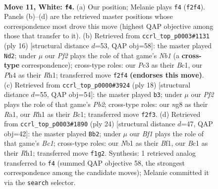 \documentclass[11pt]{article}
\begin{document}
\clearpage

\begin{figure}[p]\centering
\begin{subfigure}{0.46\textwidth}\centering
\resizebox{\linewidth}{!}{%
\newchessgame
\chessboard[
  setfen={r1b1kbnr/p1pp1ppp/4q3/4P3/2p3PP/2P5/PP2QP2/RNB1KB1R w KQkq - 1 11},
  showmover=false,
  pgfstyle=straightmove, color=movearrow, markmove={f2-f4}
]}
\caption{}
\end{subfigure}\hfill
\begin{subfigure}{0.46\textwidth}\centering
\resizebox{\linewidth}{!}{%
\newchessgame
\chessboard[
  setfen={r1b1kb1r/p1pp1ppp/2p1q3/3nP3/7P/8/PPP1QPP1/RNB1KB1R w KQkq - 1 9},
  showmover=false,
  pgfstyle=straightmove, color=movearrow, markmove={b1-d2}
]}
\caption{}
\end{subfigure}
\\[4pt]
\begin{subfigure}{0.46\textwidth}\centering
\resizebox{\linewidth}{!}{%
\newchessgame
\chessboard[
  setfen={r3kb1r/p1ppqppp/bnp5/4P3/2P5/2N5/PP2QPPP/R1B1KB1R w KQkq - 3 10},
  showmover=false,
  pgfstyle=straightmove, color=movearrow, markmove={b2-b3}
]}
\caption{}
\end{subfigure}\hfill
\begin{subfigure}{0.46\textwidth}\centering
\resizebox{\linewidth}{!}{%
\newchessgame
\chessboard[
  setfen={r1b1k2r/1pqpbppp/p7/3pP3/PP3P2/8/2PQ2PP/R1B1KB1R w KQkq - 1 13},
  showmover=false,
  pgfstyle=straightmove, color=movearrow, markmove={c1-b2}
]}
\caption{}
\end{subfigure}
\caption{\textbf{Move 11, White: \texttt{f4}.} (a) Our position; Melanie plays \texttt{f4} (\texttt{f2f4}). Panels (b)--(d) are the retrieved master positions whose correspondence most drove this move (highest QAP objective among those that transfer to it). (b) Retrieved from \texttt{ccrl\_top\_p0003\#1131} (ply 16) [structural distance $d$=53, QAP obj=58]: the master played \texttt{Nd2}; under $\mu$ our \emph{Pf2} plays the role of that game's \emph{Nb1} (a \textbf{cross-type} correspondence); cross-type roles: our \emph{P}c3 as their \emph{B}c1, our \emph{P}h4 as their \emph{R}h1; transferred move \texttt{f2f4} \textbf{(endorses this move)}. (c) Retrieved from \texttt{ccrl\_top\_p0000\#3924} (ply 18) [structural distance $d$=55, QAP obj=54]: the master played \texttt{b3}; under $\mu$ our \emph{Pf2} plays the role of that game's \emph{Pb2}; cross-type roles: our \emph{n}g8 as their \emph{R}a1, our \emph{R}h1 as their \emph{B}c1; transferred move \texttt{f2f3}. (d) Retrieved from \texttt{ccrl\_top\_p0003\#1890} (ply 24) [structural distance $d$=47, QAP obj=42]: the master played \texttt{Bb2}; under $\mu$ our \emph{Bf1} plays the role of that game's \emph{Bc1}; cross-type roles: our \emph{N}b1 as their \emph{B}f1, our \emph{B}c1 as their \emph{R}h1; transferred move \texttt{f1g2}. Synthesis: 1 retrieved analog transferred to \texttt{f4} (summed QAP objective 58, the strongest correspondence among the candidate moves); Melanie committed it via the \texttt{search} selector.}
\label{fig:thought-m20}
\end{figure}
\end{document}
